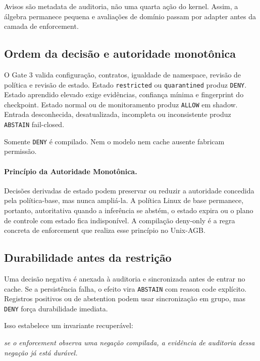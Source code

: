 \documentclass[11pt,a4paper]{article}
\begin{document}
Avisos são metadata de auditoria, não uma quarta ação do kernel. Assim, a
álgebra permanece pequena e avaliações de domínio passam por adapter antes da
camada de enforcement.

\subsection{Ordem da decisão e autoridade monotônica}

O Gate 3 valida configuração, contratos, igualdade de namespace, revisão de
política e revisão de estado. Estado \texttt{restricted} ou
\texttt{quarantined} produz \texttt{DENY}. Estado aprendido elevado exige
evidências, confiança mínima e fingerprint do checkpoint. Estado normal ou de
monitoramento produz \texttt{ALLOW} em shadow. Entrada desconhecida,
desatualizada, incompleta ou inconsistente produz \texttt{ABSTAIN} fail-closed.

Somente \texttt{DENY} é compilado. Nem o modelo nem cache ausente fabricam
permissão.

\paragraph{Princípio da Autoridade Monotônica.}
Decisões derivadas de estado podem preservar ou reduzir a autoridade concedida
pela política-base, mas nunca ampliá-la. A política Linux de base permanece,
portanto, autoritativa quando a inferência se abstém, o estado expira ou o plano
de controle com estado fica indisponível. A compilação deny-only é a regra
concreta de enforcement que realiza esse princípio no Unix-AGB.

\subsection{Durabilidade antes da restrição}

Uma decisão negativa é anexada à auditoria e sincronizada antes de entrar no
cache. Se a persistência falha, o efeito vira \texttt{ABSTAIN} com reason code
explícito. Registros positivos ou de abstention podem usar sincronização em
grupo, mas \texttt{DENY} força durabilidade imediata.

Isso estabelece um invariante recuperável:

\begin{center}
\textit{se o enforcement observa uma negação compilada, a evidência de auditoria
dessa negação já está durável.}
\end{center}
\end{document}
